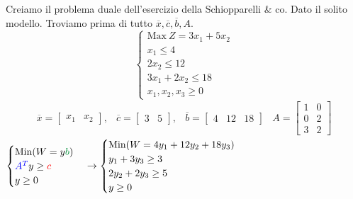 \documentclass{article}
\begin{document}
\begin{tcolorbox}[
    colback=lightgray,
    colframe=black,
    coltext=black,
    title=Esempio,
    colbacktitle=black,
    coltitle=lightgray,
    breakable
  ]
  Creiamo il problema duale dell'esercizio della Schiopparelli \& co. Dato il solito modello. Troviamo prima di tutto $\overline{x}, \overline{c}, \overline{b}, A$.\\
  \begin{equation*}
    \begin{cases}
      \text{Max}\ Z = 3x_1 + 5x_2 \\
      x_1 \le 4                   \\
      2x_2 \le 12                 \\
      3x_1 + 2x_2 \le 18          \\
      x_1, x_2, x_3 \ge 0
    \end{cases}
  \end{equation*}
  \begin{equation*}
    \begin{array}{cccc}
      \overline{x} = \begin{bmatrix} x_1 & x_2 \end{bmatrix},  &
      \overline{c} = \begin{bmatrix} 3 & 5 \end{bmatrix},      &
      \overline{b} = \begin{bmatrix} 4 & 12 & 18 \end{bmatrix} &
      A = \begin{bmatrix} 1 & 0\\ 0 & 2 \\ 3 & 2\end{bmatrix}
    \end{array}
  \end{equation*}
  $
    \begin{cases}
      \text{Min}(W=y\textcolor{darkgreen}{b})         \\
      \textcolor{blue}{A^{T}}y \ge \textcolor{red}{c} \\
      y \ge 0
    \end{cases}
    \to
    \begin{cases}
      \text{Min}(W=4y_1+12y_2+18y_3) \\
      y_1+3y_3 \ge 3                 \\
      2y_2+2y_3 \ge 5                \\
      y \ge 0
    \end{cases}
  $

\end{tcolorbox}
\end{document}

